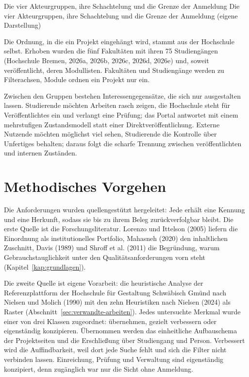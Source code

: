 %
{Die vier Akteurgruppen, ihre Schachtelung und die Grenze der Anmeldung}%
{Die vier Akteurgruppen, ihre Schachtelung und die Grenze der Anmeldung (eigene Darstellung)}

Die Ordnung, in die ein Projekt eingehängt wird, stammt aus der Hochschule selbst. Erhoben wurden die fünf Fakultäten mit ihren 75 Studiengängen (Hochschule Bremen, 2026a, 2026b, 2026c, 2026d, 2026e) und, soweit veröffentlicht, deren Modullisten. Fakultäten und Studiengänge werden zu Filterachsen, Module ordnen ein Projekt nur ein.

Zwischen den Gruppen bestehen Interessengegensätze, die sich nur ausgestalten lassen. Studierende möchten Arbeiten rasch zeigen, die Hochschule steht für Veröffentlichtes ein und verlangt eine Prüfung; das Portal antwortet mit einem mehrstufigen Zustandsmodell statt einer Direktveröffentlichung. Externe Nutzende möchten möglichst viel sehen, Studierende die Kontrolle über Unfertiges behalten; daraus folgt die scharfe Trennung zwischen veröffentlichten und internen Zuständen.

\section{Methodisches Vorgehen}
\label{sec:methodisches-vorgehen}

Die Anforderungen wurden quellengestützt hergeleitet: Jede erhält eine Kennung und eine Herkunft, sodass sie bis zu ihrem Beleg zurückverfolgbar bleibt. Die erste Quelle ist die Forschungsliteratur. Lorenzo und Ittelson (2005) liefern die Einordnung als institutionelles Portfolio, Mahasneh (2020) den inhaltlichen Zuschnitt, Davis (1989) und Shroff et al. (2011) die Begründung, warum Gebrauchstauglichkeit unter den Qualitätsanforderungen vorn steht (Kapitel~\ref{kap:grundlagen}).

Die zweite Quelle ist eigene Vorarbeit: die heuristische Analyse der Referenzplattform der Hochschule für Gestaltung Schwäbisch Gmünd nach Nielsen und Molich (1990) mit den zehn Heuristiken nach Nielsen (2024) als Raster (Abschnitt~\ref{sec:verwandte-arbeiten}). Jedes untersuchte Merkmal wurde einer von drei Klassen zugeordnet: übernehmen, gezielt verbessern oder eigenständig konzipieren. Übernommen werden das einheitliche Aufbauschema der Projektseiten und die Erschließung über Studiengang und Person. Verbessert wird die Auffindbarkeit, weil dort jede Suche fehlt und sich die Filter nicht verbinden lassen. Einreichung, Prüfung und Verwaltung sind eigenständig konzipiert, denn zugänglich war nur die Sicht ohne Anmeldung.

